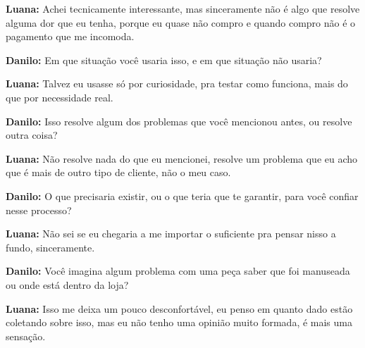 \textbf{Luana:} Achei tecnicamente interessante, mas sinceramente não é algo que resolve alguma dor que eu tenha, porque eu quase não compro e quando compro não é o pagamento que me incomoda.

\textbf{Danilo:} Em que situação você usaria isso, e em que situação não usaria?

\textbf{Luana:} Talvez eu usasse só por curiosidade, pra testar como funciona, mais do que por necessidade real.

\textbf{Danilo:} Isso resolve algum dos problemas que você mencionou antes, ou resolve outra coisa?

\textbf{Luana:} Não resolve nada do que eu mencionei, resolve um problema que eu acho que é mais de outro tipo de cliente, não o meu caso.

\textbf{Danilo:} O que precisaria existir, ou o que teria que te garantir, para você confiar nesse processo?

\textbf{Luana:} Não sei se eu chegaria a me importar o suficiente pra pensar nisso a fundo, sinceramente.

\textbf{Danilo:} Você imagina algum problema com uma peça saber que foi manuseada ou onde está dentro da loja?

\textbf{Luana:} Isso me deixa um pouco desconfortável, eu penso em quanto dado estão coletando sobre isso, mas eu não tenho uma opinião muito formada, é mais uma sensação.

